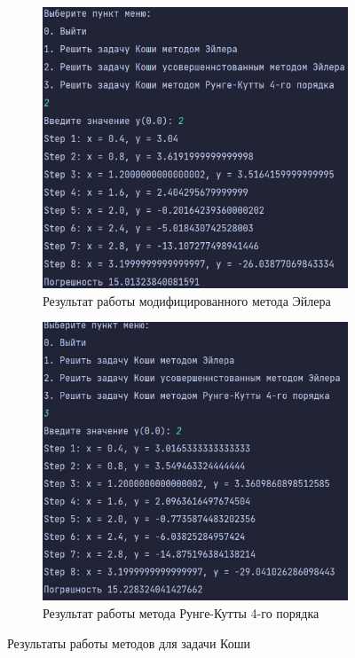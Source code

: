 \documentclass[12pt]{article}
\begin{document}
\begin{figure}[ht]
\begin{subfigure}{0.4\textwidth}
\includegraphics[width=\linewidth]{modified_euler_method.png}
\caption{Результат работы модифицированного метода Эйлера}
\end{subfigure}
\hfill
\begin{subfigure}{0.4\textwidth}
\includegraphics[width=\linewidth]{runge_kutta_method.png}
\caption{Результат работы метода Рунге-Кутты 4-го порядка}
\end{subfigure}
\caption{Результаты работы методов для задачи Коши}
\end{figure}
\end{document}
